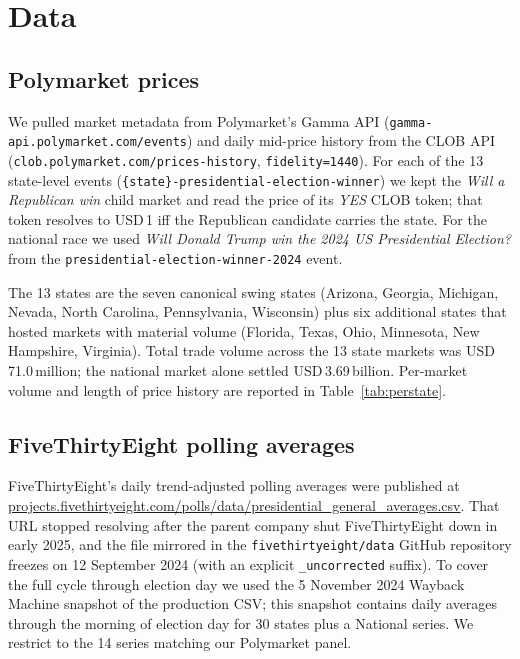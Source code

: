 \documentclass{article}
\begin{document}
\section{Data}
\label{sec:data}

\subsection{Polymarket prices}
\label{sec:data-poly}

We pulled market metadata from Polymarket's Gamma API
(\texttt{gamma-api.polymarket.com/events}) and daily mid-price history
from the CLOB API
(\texttt{clob.polymarket.com/prices-history}, \texttt{fidelity=1440}).
For each of the 13 state-level events
(\texttt{\{state\}-presidential-election-winner}) we kept the
\emph{Will a Republican win} child market and read the price of its
\textit{YES} CLOB token; that token resolves to USD\,1 iff the Republican
candidate carries the state. For the national race we used
\emph{Will Donald Trump win the 2024 US Presidential Election?} from the
\texttt{presidential-election-winner-2024} event.

The 13 states are the seven canonical swing states (Arizona, Georgia,
Michigan, Nevada, North Carolina, Pennsylvania, Wisconsin) plus six
additional states that hosted markets with material volume
(Florida, Texas, Ohio, Minnesota, New Hampshire, Virginia). Total
trade volume across the 13 state markets was USD\,71.0\,million; the
national market alone settled USD\,3.69\,billion. Per-market volume and
length of price history are reported in
Table~\ref{tab:perstate}.

\subsection{FiveThirtyEight polling averages}
\label{sec:data-fte}

FiveThirtyEight's daily trend-adjusted polling averages were published at
\url{projects.fivethirtyeight.com/polls/data/presidential_general_averages.csv}.
That URL stopped resolving after the parent company shut FiveThirtyEight
down in early 2025, and the file mirrored in the
\texttt{fivethirtyeight/data} GitHub repository freezes on 12 September
2024 (with an explicit \texttt{\_uncorrected} suffix). To cover the full
cycle through election day we used the 5 November 2024 Wayback Machine
snapshot of the production CSV; this snapshot contains daily averages
through the morning of election day for 30 states plus a National series.
We restrict to the 14 series matching our Polymarket panel.
\end{document}

